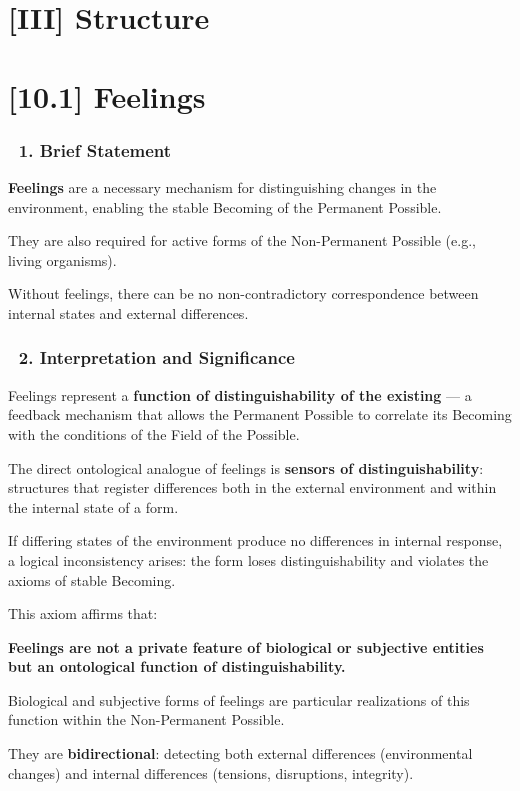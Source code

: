 \documentclass[12pt]{article}
\begin{document}
\section*{[III] Structure}

\section*{[10.1] Feelings}

\subsubsection*{🔹 1. Brief Statement}
\textbf{Feelings} are a necessary mechanism for distinguishing changes in the environment, enabling the stable Becoming of the Permanent Possible.

They are also required for active forms of the Non-Permanent Possible (e.g., living organisms).

Without feelings, there can be no non-contradictory correspondence between internal states and external differences.

\subsubsection*{🔹 2. Interpretation and Significance}
Feelings represent a \textbf{function of distinguishability of the existing} — a feedback mechanism that allows the Permanent Possible to correlate its Becoming with the conditions of the Field of the Possible.

The direct ontological analogue of feelings is \textbf{sensors of distinguishability}: structures that register differences both in the external environment and within the internal state of a form.

If differing states of the environment produce no differences in internal response, a logical inconsistency arises: the form loses distinguishability and violates the axioms of stable Becoming.

This axiom affirms that:

\textbf{Feelings are not a private feature of biological or subjective entities but an ontological function of distinguishability.}

Biological and subjective forms of feelings are particular realizations of this function within the Non-Permanent Possible.

They are \textbf{bidirectional}: detecting both external differences (environmental changes) and internal differences (tensions, disruptions, integrity).
\end{document}
